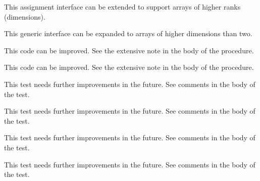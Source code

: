 \begin{DoxyRefList}
%
 This assignment interface can be extended to support arrays of higher ranks (dimensions). 
\item[Type \mbox{\hyperlink{interfaceString__mod_1_1val2char}{String\+\_\+mod\+::val2char}} ]\label{todo__todo000060}%
%
 This generic interface can be expanded to arrays of higher dimensions than two. 
\item[Subprogram \mbox{\hyperlink{namespaceSystem__mod_a8f999de90840ba33f9cf7f30edd41b3d}{System\+\_\+mod\+::copy\+File}} (path\+Old, path\+New, is\+Unix\+Shell, Err)]\label{todo__todo000063}%
%
 This code can be improved. See the extensive note in the body of the procedure.  
\item[Subprogram \mbox{\hyperlink{namespaceSystem__mod_acdbe0231b40135bc08ab285fc69f2b80}{System\+\_\+mod\+::get\+System\+Info}} (List, Err, OS, count, cache\+File)]\label{todo__todo000062}%
%
 This code can be improved. See the extensive note in the body of the procedure.  
\item[Subprogram \mbox{\hyperlink{namespaceTest__System__mod_a56a58918b2888e7ea0fa691de93cdeb3}{Test\+\_\+\+System\+\_\+mod\+::test\+\_\+\+Cmd\+Arg\+\_\+type\+\_\+1}} ()]\label{todo__todo000070}%
%
 This test needs further improvements in the future. See comments in the body of the test.  
\item[Subprogram \mbox{\hyperlink{namespaceTest__System__mod_a43fd8159ffe52170057e95d4e0c38d63}{Test\+\_\+\+System\+\_\+mod\+::test\+\_\+\+Env\+Var\+\_\+type\+\_\+1}} ()]\label{todo__todo000067}%
%
 This test needs further improvements in the future. See comments in the body of the test.  
\item[Subprogram \mbox{\hyperlink{namespaceTest__System__mod_ab0121f340538dae91c97cc5cdcba0a7b}{Test\+\_\+\+System\+\_\+mod\+::test\+\_\+\+Env\+Var\+\_\+type\+\_\+2}} ()]\label{todo__todo000068}%
%
 This test needs further improvements in the future. See comments in the body of the test.  
\item[Subprogram \mbox{\hyperlink{namespaceTest__System__mod_a26054fb4e3bf2d05710adc7965bc8431}{Test\+\_\+\+System\+\_\+mod\+::test\+\_\+\+Env\+Var\+\_\+type\+\_\+3}} ()]\label{todo__todo000069}%
%
 This test needs further improvements in the future. See comments in the body of the test.  
\item[Subprogram \mbox{\hyperlink{namespaceTest__System__mod_a8d37f80583c104a3dfb6b99a897feb26}{Test\+\_\+\+System\+\_\+mod\+::test\+\_\+execute\+Cmd\+\_\+1}} ()]\label{todo__todo000075}%

\end{DoxyRefList}
